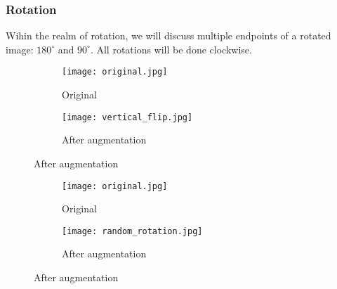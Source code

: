 
\subsubsection{Rotation}
\begin{fullwidth}
	Wihin the realm of rotation, we will discuss multiple endpoints of a rotated image: $180^{\circ}$ and $90^{\circ}$. 
	All rotations will be done clockwise. 
\end{fullwidth}


\begin{figure}[H]
	\centering
	\begin{subfigure}{0.45\textwidth}
		\texttt{[image: original.jpg]}
		\caption{Original}
		\label{fig:original}
	\end{subfigure}
	\hfill
	\begin{subfigure}{0.45\textwidth}
		\texttt{[image: vertical\_flip.jpg]}
		\caption{After augmentation}
		\label{fig:vertical_flip}
	\end{subfigure}
	\label{fig:comparison}
\end{figure}

{}

\begin{figure}[H]
	\centering
	\begin{subfigure}{0.45\textwidth}
		\texttt{[image: original.jpg]}
		\caption{Original}
		\label{fig:original}
	\end{subfigure}
	\hfill
	\begin{subfigure}{0.45\textwidth}
		\texttt{[image: random\_rotation.jpg]}
		\caption{After augmentation}
		\label{fig:random_rotation}
	\end{subfigure}
	\label{fig:comparison}
\end{figure}

